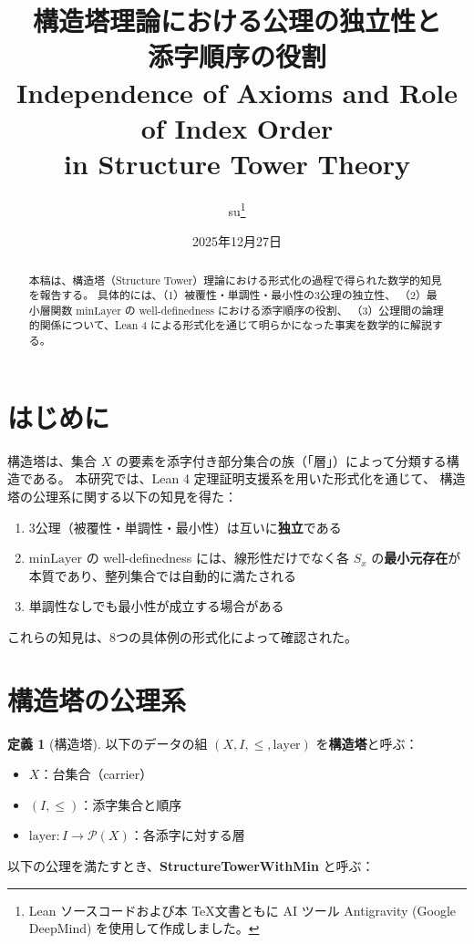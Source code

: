\documentclass[a4paper,11pt]{ltjsarticle}
\title{%
    \textbf{構造塔理論における公理の独立性と\\添字順序の役割}\\[0.5em]
    \Large Independence of Axioms and Role of Index Order\\in Structure Tower Theory
}
\author{su\thanks{Lean ソースコードおよび本 \TeX 文書ともに AI ツール Antigravity (Google DeepMind) を使用して作成しました。}}
\date{2025年12月27日}
\theoremstyle{definition}
\newtheorem{definition}{定義}[section]
\theoremstyle{plain}
\theoremstyle{remark}
\newcommand{\Layer}{\mathrm{layer}}
\newcommand{\minLayer}{\mathrm{minLayer}}
\begin{document}
\maketitle

\begin{abstract}
本稿は、構造塔（Structure Tower）理論における形式化の過程で得られた数学的知見を報告する。
具体的には、（1）被覆性・単調性・最小性の3公理の独立性、
（2）最小層関数 $\minLayer$ の well-definedness における添字順序の役割、
（3）公理間の論理的関係について、Lean 4 による形式化を通じて明らかになった事実を数学的に解説する。
\end{abstract}

\tableofcontents

\newpage

\section{はじめに}

構造塔は、集合 $X$ の要素を添字付き部分集合の族（「層」）によって分類する構造である。
本研究では、Lean 4 定理証明支援系を用いた形式化を通じて、
構造塔の公理系に関する以下の知見を得た：

\begin{enumerate}
    \item 3公理（被覆性・単調性・最小性）は互いに\textbf{独立}である
    \item $\minLayer$ の well-definedness には、線形性だけでなく各 $S_x$ の\textbf{最小元存在}が本質であり、整列集合では自動的に満たされる
    \item 単調性なしでも最小性が成立する場合がある
\end{enumerate}

これらの知見は、8つの具体例の形式化によって確認された。

\section{構造塔の公理系}

\begin{definition}[構造塔]
以下のデータの組 $(X, I, \leq, \Layer)$ を\textbf{構造塔}と呼ぶ：
\begin{itemize}
    \item $X$：台集合（carrier）
    \item $(I, \leq)$：添字集合と順序
    \item $\Layer : I \to \mathcal{P}(X)$：各添字に対する層
\end{itemize}
以下の公理を満たすとき、\textbf{StructureTowerWithMin} と呼ぶ：
\end{definition}
\end{document}
